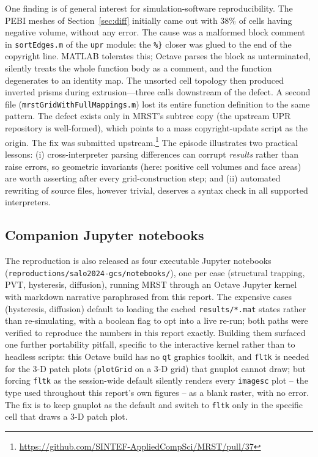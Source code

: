 \documentclass[preprint,11pt]{elsarticle}
\begin{document}
One finding is of general interest for simulation-software
reproducibility. The PEBI meshes of Section~\ref{sec:diff} initially
came out with 38\% of cells having negative volume, without any error.
The cause was a malformed block comment in
\texttt{sortEdges.m} of the \texttt{upr} module: the \texttt{\%\}}
closer was glued to the end of the copyright line. MATLAB tolerates
this; Octave parses the block as unterminated, silently treats the whole
function body as a comment, and the function degenerates to an identity
map. The unsorted cell topology then produced inverted prisms during
extrusion---three calls downstream of the defect. A second file
(\texttt{mrstGridWithFullMappings.m}) lost its entire function
definition to the same pattern. The defect exists only in MRST's subtree
copy (the upstream UPR repository is well-formed), which points to a
mass copyright-update script as the origin. The fix was submitted
upstream.\footnote{\url{https://github.com/SINTEF-AppliedCompSci/MRST/pull/37}}
The episode illustrates two practical lessons: (i) cross-interpreter
parsing differences can corrupt \emph{results} rather than raise errors,
so geometric invariants (here: positive cell volumes and face areas) are
worth asserting after every grid-construction step; and (ii) automated
rewriting of source files, however trivial, deserves a syntax check in
all supported interpreters.

\subsection{Companion Jupyter notebooks}

The reproduction is also released as four executable Jupyter notebooks
(\texttt{reproductions/salo2024-gcs/notebooks/}), one per case
(structural trapping, PVT, hysteresis, diffusion), running MRST through
an Octave Jupyter kernel with markdown narrative paraphrased from this
report. The expensive cases (hysteresis, diffusion) default to loading
the cached \texttt{results/*.mat} states rather than re-simulating, with
a boolean flag to opt into a live re-run; both paths were verified to
reproduce the numbers in this report exactly. Building them surfaced one
further portability pitfall, specific to the interactive kernel rather
than to headless scripts: this Octave build has no \texttt{qt} graphics
toolkit, and \texttt{fltk} is needed for the 3-D patch plots (\texttt{plotGrid}
on a 3-D grid) that gnuplot cannot draw; but forcing \texttt{fltk} as the
session-wide default silently renders every \texttt{imagesc} plot --
the type used throughout this report's own figures -- as a blank raster,
with no error. The fix is to keep gnuplot as the default and switch to
\texttt{fltk} only in the specific cell that draws a 3-D patch plot.
\end{document}
